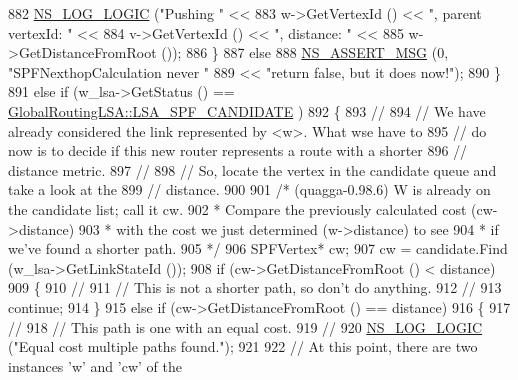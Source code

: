 \begin{DoxyCode}
882               \hyperlink{group__logging_ga88acd260151caf2db9c0fc84997f45ce}{NS\_LOG\_LOGIC} (\textcolor{stringliteral}{"Pushing "} << 
883                             w->GetVertexId () << \textcolor{stringliteral}{", parent vertexId: "} <<
884                             v->GetVertexId () << \textcolor{stringliteral}{", distance: "} <<
885                             w->GetDistanceFromRoot ());
886             \}
887           \textcolor{keywordflow}{else}
888             \hyperlink{assert_8h_aff5ece9066c74e681e74999856f08539}{NS\_ASSERT\_MSG} (0, \textcolor{stringliteral}{"SPFNexthopCalculation never "} 
889                            << \textcolor{stringliteral}{"return false, but it does now!"});
890         \}
891       \textcolor{keywordflow}{else} \textcolor{keywordflow}{if} (w\_lsa->GetStatus () == \hyperlink{classns3_1_1GlobalRoutingLSA_a18bf63da580856fe1cc158aa855af1bda9f23e66077c059f58318033586e74c50}{GlobalRoutingLSA::LSA\_SPF\_CANDIDATE}
      )
892         \{
893 \textcolor{comment}{//}
894 \textcolor{comment}{// We have already considered the link represented by <w>.  What wse have to}
895 \textcolor{comment}{// do now is to decide if this new router represents a route with a shorter}
896 \textcolor{comment}{// distance metric.}
897 \textcolor{comment}{//}
898 \textcolor{comment}{// So, locate the vertex in the candidate queue and take a look at the }
899 \textcolor{comment}{// distance.}
900 
901 \textcolor{comment}{/* (quagga-0.98.6) W is already on the candidate list; call it cw.}
902 \textcolor{comment}{* Compare the previously calculated cost (cw->distance)}
903 \textcolor{comment}{* with the cost we just determined (w->distance) to see}
904 \textcolor{comment}{* if we've found a shorter path.}
905 \textcolor{comment}{*/}
906           SPFVertex* cw;
907           cw = candidate.Find (w\_lsa->GetLinkStateId ());
908           \textcolor{keywordflow}{if} (cw->GetDistanceFromRoot () < distance)
909             \{
910 \textcolor{comment}{//}
911 \textcolor{comment}{// This is not a shorter path, so don't do anything.}
912 \textcolor{comment}{//}
913               \textcolor{keywordflow}{continue};
914             \}
915           \textcolor{keywordflow}{else} \textcolor{keywordflow}{if} (cw->GetDistanceFromRoot () == distance)
916             \{
917 \textcolor{comment}{//}
918 \textcolor{comment}{// This path is one with an equal cost.}
919 \textcolor{comment}{//}
920               \hyperlink{group__logging_ga88acd260151caf2db9c0fc84997f45ce}{NS\_LOG\_LOGIC} (\textcolor{stringliteral}{"Equal cost multiple paths found."});
921 
922 \textcolor{comment}{// At this point, there are two instances 'w' and 'cw' of the}

\end{DoxyCode}
